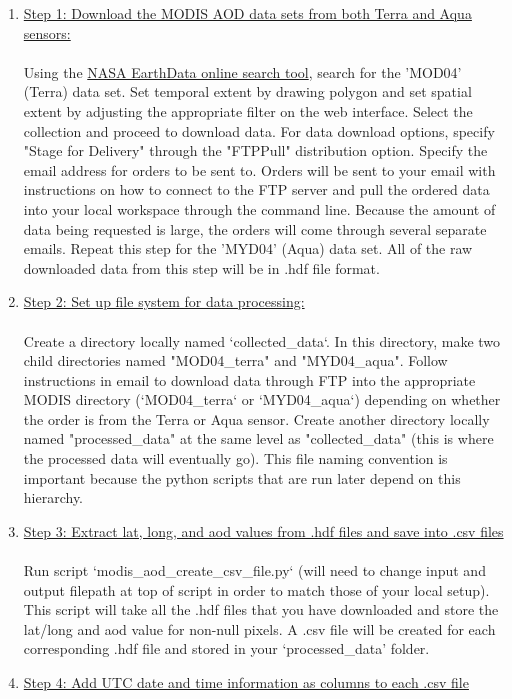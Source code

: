 \begin{enumerate}
\item \underline{Step 1: Download the MODIS AOD data sets from both Terra and Aqua sensors:}\\\\
Using the \href{https://search.earthdata.nasa.gov/search?q=MOD04&ok=MOD04}{NASA EarthData online search tool}, search for the 'MOD04' (Terra) data set. Set temporal extent by drawing polygon and set spatial extent by adjusting the appropriate filter on the web interface. Select the collection and proceed to download data. For data download options, specify "Stage for Delivery" through the "FTPPull" distribution option. Specify the email address for orders to be sent to. Orders will be sent to your email with instructions on how to connect to the FTP server and pull the ordered data into your local workspace through the command line. Because the amount of data being requested is large, the orders will come through several separate emails. Repeat this step for the 'MYD04' (Aqua) data set. All of the raw downloaded data from this step will be in .hdf file format.
\item  \underline{Step 2: Set up file system for data processing:}\\\\ 
Create a directory locally named `collected\_data`. In this directory, make two child directories named "MOD04\_terra" and "MYD04\_aqua". Follow instructions in email to download data through FTP into the appropriate MODIS directory (`MOD04\_terra` or `MYD04\_aqua`) depending on whether the order is from the Terra or Aqua sensor. Create another directory locally named "processed\_data" at the same level as "collected\_data" (this is where the processed data will eventually go). This file naming convention is important because the python scripts that are run later depend on this hierarchy.
\item \underline{Step 3: Extract lat, long, and aod values from .hdf files and save into .csv files}\\\\
Run script `modis\_aod\_create\_csv\_file.py` (will need to change input and output filepath at top of script in order to match those of your local setup). This script will take all the .hdf files that you have downloaded and store the lat/long and aod value for non-null pixels. A .csv file will be created for each corresponding .hdf file and stored in your `processed\_data' folder.
\item \underline{Step 4: Add UTC date and time information as columns to each .csv file}\\\\

\end{enumerate}
